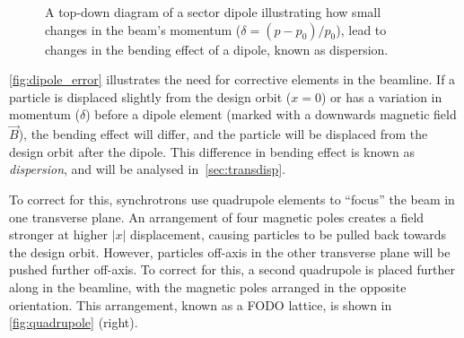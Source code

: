 \documentclass[11pt]{report}
\begin{document}
\begin{figure}[h]
\begin{tikzpicture}[x=0.75pt,y=0.75pt,yscale=-1,xscale=1]
\end{tikzpicture}
\caption{A top-down diagram of a sector dipole illustrating how small changes in the beam's momentum ($\delta = (p-p_0)/p_0$), lead to changes in the bending effect of a dipole, known as dispersion.}
\label{fig:dipole_error}
\end{figure}

\autoref{fig:dipole_error} illustrates the need for corrective elements in the beamline. If a particle is displaced slightly from the design orbit ($x=0$) or has a variation in momentum ($\delta$) before a dipole element (marked with a downwards magnetic field $\vec B$), the bending effect will differ, and the particle will be displaced from the design orbit after the dipole. This difference in bending effect is known as \textit{dispersion}, and will be analysed in~\autoref{sec:transdisp}.

To correct for this, synchrotrons use quadrupole elements to ``focus'' the beam in one transverse plane. An arrangement of four magnetic poles creates a field stronger at higher $|x|$ displacement, causing particles to be pulled back towards the design orbit. However, particles off-axis in the other transverse plane will be pushed further off-axis. To correct for this, a second quadrupole is placed further along in the beamline, with the magnetic poles arranged in the opposite orientation. This arrangement, known as a FODO lattice, is shown in \autoref{fig:quadrupole} (right).
\end{document}
